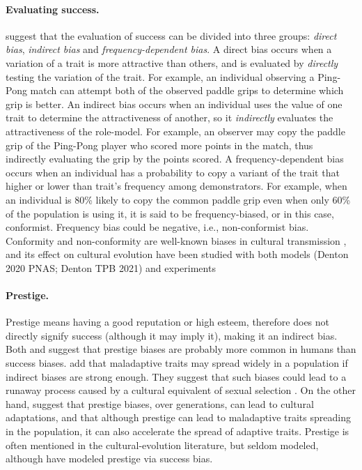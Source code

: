 \documentclass[12pt]{extarticle}
\begin{document}
\paragraph{Evaluating success.}
\citet[Ch. 5]{evolutionBook} suggest that the evaluation of success can be divided into three groups: \textit{direct bias}, \textit{indirect bias} and \textit{frequency-dependent bias}.
A direct bias occurs when a variation of a trait is more attractive than others, and is evaluated by \textit{directly} testing the variation of the trait.
For example, an individual observing a Ping-Pong match can attempt both of the observed paddle grips to determine which grip is better.
An indirect bias occurs when an individual uses the value of one trait to determine the attractiveness of another, so it \textit{indirectly} evaluates the attractiveness of the role-model.
For example, an observer may copy the paddle grip of the Ping-Pong player who scored more points in the match, thus indirectly evaluating the grip by the points scored.
A frequency-dependent bias occurs when an individual has a probability to copy a variant of the trait that higher or lower than trait's frequency among demonstrators. 
For example, when an individual is 80\% likely to copy the common paddle grip even when only 60\% of the population is using it, it is said to be frequency-biased, or in this case, conformist.
Frequency bias could be negative, i.e., non-conformist bias. 
Conformity and non-conformity are well-known biases in cultural transmission \citep{conformism}, and its effect on cultural evolution have been studied with both models (Denton 2020 PNAS; Denton TPB 2021) and experiments \citet{negativeFrequency} 
 
\paragraph{Prestige.}
Prestige means having a good reputation or high esteem, therefore does not directly signify success (although it may imply it), making it an indirect bias.
Both \citet[Ch. 8]{evolutionBook} and \citet{complexityPaper} suggest that prestige biases are probably more common in humans than success biases.
\citet[Ch. 8]{evolutionBook} add that maladaptive traits may spread widely in a population if indirect biases are strong enough.
They suggest that such biases could lead to a runaway process caused by a cultural equivalent of sexual selection \citep{sexualSelectionBook}.
On the other hand, \citet{fijian_social_bias} suggest that prestige biases, over generations, can lead to cultural adaptations, and that although prestige can lead to maladaptive traits spreading in the population, it can also accelerate the spread of adaptive traits.
Prestige is often mentioned in the cultural-evolution literature, but seldom modeled, although \citet{evolutionBook} have modeled prestige via success bias. %
\end{document}
